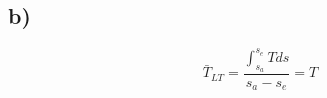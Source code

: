 

\subsection*{b)}

\begin{equation*}
\bar{T}_{LT} = \frac{\int_{s_a}^{s_e} T ds}{s_a - s_e} = T
\end{equation*}